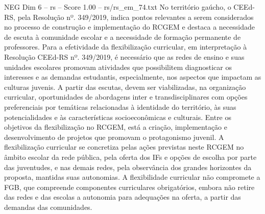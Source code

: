 \begin{textsample}{NEG Dim 6 – rs – Score 1.00 – rs/rs\_em\_74.txt}
No território gaúcho, o CEEd-RS, pela Resolução nº. 349/2019, indica pontos relevantes a serem considerados no processo de construção e implementação do RCGEM e destaca a necessidade de escuta à comunidade escolar e a necessidade de formação permanente de professores.
Para a efetividade da flexibilização curricular, em interpretação à Resolução CEEd-RS nº. 349/2019, é necessário que as redes de ensino e suas unidades escolares promovam atividades que possibilitem diagnosticar os interesses e as demandas estudantis, especialmente, nos aspectos que impactam as culturas juvenis.
A partir das escutas, devem ser viabilizadas, na organização curricular, oportunidades de abordagens inter e transdisciplinares com opções preferenciais por temáticas relacionadas à identidade do território, às suas potencialidades e às características socioeconômicas e culturais.
Entre os objetivos da flexibilização no RCGEM, está a criação, implementação e desenvolvimento de projetos que promovam o protagonismo juvenil.
A flexibilização curricular se concretiza pelas ações previstas neste RCGEM no âmbito escolar da rede pública, pela oferta dos IFs e opções de escolha por parte das juventudes, e nas demais redes, pela observância dos grandes horizontes da proposta, mantidas suas autonomias.
A flexibilidade curricular não compromete a FGB, que compreende componentes curriculares obrigatórios, embora não retire das redes e das escolas a autonomia para adequações na oferta, a partir das demandas das comunidades.

\end{textsample}
